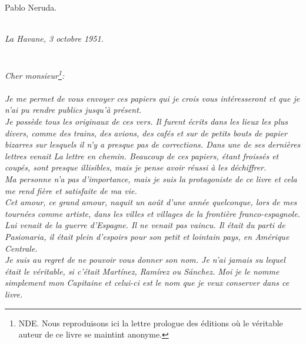 \documentclass[11pt,a4paper]{book}
\begin{document}
\hspace*{80mm} {\sc Pablo Neruda}. \\ \\


\cleardoublepage

{\em
\hspace*{80mm} La Havane, 3 octobre 1951. \\ \\ \\

\noindent Cher monsieur\footnote{NDE. Nous reproduisons ici la
lettre prologue des éditions où le véritable auteur de ce livre se
maintint anonyme.}: \\ \\

Je me permet de vous envoyer ces papiers qui je crois vous
intéresseront et que je n'ai pu rendre publics jusqu'à présent. \\

Je possède tous les originaux de ces vers. Il furent écrits dans les
lieux les plus divers, comme des trains, des avions, des cafés et sur
de petits bouts de papier bizarres sur lesquels il n'y a presque pas
de corrections. Dans une de ses dernières lettres venait {\em La
lettre en chemin}. Beaucoup de ces papiers, étant froissés et coupés,
sont presque illisibles, mais je pense avoir réussi à les
déchiffrer. \\

Ma personne n'a pas d'importance, mais je suis la protagoniste de ce
livre et cela me rend fière et satisfaite de ma vie. \\

Cet amour, ce grand amour, naquit un août d'une année quelconque, lors
de mes tournées comme artiste, dans les villes et villages de la
frontière franco-espagnole. \\

Lui venait de la guerre d'Espagne. Il ne venait pas vaincu. Il était
du parti de Pasionaria, il était plein d'espoirs pour son petit et
lointain pays, en Amérique Centrale. \\

Je suis au regret de ne pouvoir vous donner son nom. Je n'ai jamais su
lequel était le véritable, si c'était Martínez, Ramírez ou
Sánchez. Moi je le nomme simplement mon Capitaine et celui-ci est le
nom que je veux conserver dans ce livre. \\

}
\end{document}
